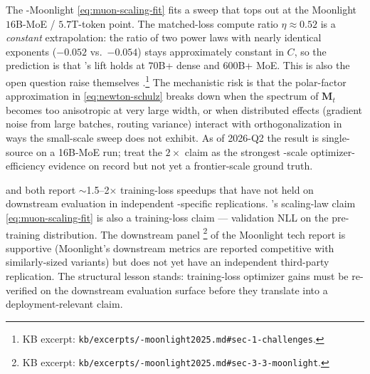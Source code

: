 \begin{contradiction}
\label{contra:muon-frontier-scale}
The -Moonlight  \eqref{eq:muon-scaling-fit} fits a
sweep that tops out at the Moonlight $16$B-MoE / $5.7$T-token point.
The matched-loss compute ratio $\eta \approx 0.52$ is a
\emph{constant} extrapolation: the ratio of two power laws with
nearly identical exponents ($-0.052$ vs.\ $-0.054$) stays
approximately constant in $C$, so the prediction is that 's lift
holds at $70$B+ dense and $600$B+ MoE. This is also the open
question \citet{muon-moonlight2025} raise themselves \citep[\S
1]{muon-moonlight2025}.\protect\footnote{KB excerpt:
\texttt{kb/excerpts/-moonlight2025.md\#sec-1-challenges}.} The
mechanistic risk is that the polar-factor approximation in
\cref{eq:newton-schulz} breaks down when the spectrum of
$\mathbf{M}_t$ becomes too anisotropic at very large width, or when
distributed effects (gradient noise from large batches,  routing
variance) interact with orthogonalization in ways the small-scale
sweep does not exhibit. As of 2026-Q2 the result is single-source
on a 16B-MoE run; treat the $2\times$ claim as the strongest
-scale optimizer-efficiency evidence on record but not yet a
frontier-scale ground truth.
\end{contradiction}

\begin{contradiction}
\label{contra:training-loss-vs-downstream}
 \citep[Chen et al.\ 2023]{muon-moonlight2025} and 
\citep[Liu, Li et al.\ 2023]{muon-moonlight2025} both report
$\sim$1.5--2$\times$ training-loss speedups that have not held on
downstream evaluation in independent
-specific replications. 's scaling-law claim
\eqref{eq:muon-scaling-fit} is also a training-loss claim ---
validation NLL on the pre-training distribution. The downstream
panel \citep[\S 3]{muon-moonlight2025}\protect\footnote{KB excerpt:
\texttt{kb/excerpts/-moonlight2025.md\#sec-3-3-moonlight}.} of
the Moonlight tech report is supportive (Moonlight's downstream
metrics are reported competitive with similarly-sized 
variants) but does not yet have an independent third-party
replication. The structural lesson stands: training-loss optimizer
gains must be re-verified on the downstream evaluation surface
before they translate into a deployment-relevant claim.
\end{contradiction}

